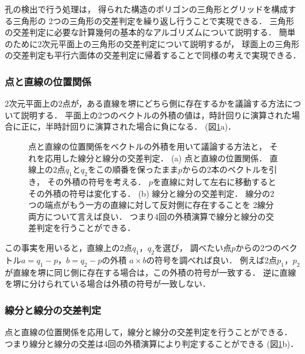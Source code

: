 孔の検出で行う処理は，
得られた構造のポリゴンの三角形とグリッドを構成する三角形の
2つの三角形の交差判定を繰り返し行うことで実現できる．
三角形の交差判定に必要な計算幾何の基本的なアルゴリズムについて説明する．
簡単のために2次元平面上の三角形の交差判定について説明するが，
球面上の三角形の交差判定も平行六面体の交差判定に帰着することで同様の考えで実現できる．


\subsubsection{点と直線の位置関係}
2次元平面上の2点が，ある直線を堺にどちら側に存在するかを議論する方法について説明する．
平面上の2つのベクトルの外積の値は，時計回りに演算された場合に正に，半時計回りに演算された場合に負になる．
(図\ref{fig:segment_segment}a)．
\begin{figure}
    \centering
    
    \caption{
        点と直線の位置関係をベクトルの外積を用いて議論する方法と，
        それを応用した線分と線分の交差判定．
        (a) 点と直線の位置関係．
            直線上の2点$q_1$と$q_2$をこの順番を保ったまま$p$からの2本のベクトルを引き，
            その外積の符号を考える．
            $p$を直線に対して左右に移動するとその外積の符号は変化する．
        (b) 線分と線分の交差判定．
            線分の2つの端点がもう一方の直線に対して反対側に存在することを
            2線分両方について言えば良い．
            つまり4回の外積演算で線分と線分の交差判定を行うことができる．
    }
    \label{fig:segment_segment}
\end{figure}
この事実を用いると，直線上の2点$q_1$，$q_2$を選び，
調べたい点$p$からの2つのベクトル$a=q_1-p$，$b=q_2-p$の外積
$a\times b$の符号を調べれば良い．
例えば2点$p_1$，$p_2$が直線を堺に同じ側に存在する場合は，この外積の符号が一致する．
逆に直線を堺に分けられている場合は外積の符号が一致しない．


\subsubsection{線分と線分の交差判定}
点と直線の位置関係を応用して，線分と線分の交差判定を行うことができる．
つまり線分と線分の交差は4回の外積演算により判定することができる
(図\ref{fig:segment_segment}b)．


